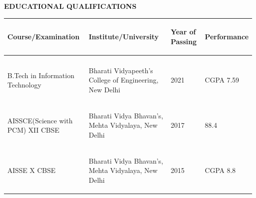 \documentclass[10pt]{article}
\begin{document}
\begin{minipage}{\textwidth}
\vspace{5mm}
\begin{huge}
\textbf{\color{theme}EDUCATIONAL QUALIFICATIONS}
\end{huge}
\begin{mdframed}[backgroundcolor=theme]
\end{mdframed}

\vspace{1mm}

\begin{tabular}{||m{4cm}|m{4cm}|m{2cm}|m{3cm}||}
\hline
\hline

\begin{center}
\textbf{Course/Examination}
\end{center} & \begin{center}
\textbf{Institute/University}
\end{center} & \begin{center}
\textbf{Year of Passing}
\end{center} & \begin{center}
\textbf{Performance}
\end{center}\\
\hline
&&&\\
\begin{center}
B.Tech in Information Technology
\end{center} & \begin{center}
Bharati Vidyapeeth's College of Engineering, New Delhi
\end{center} & \begin{center}
2021
\end{center} & \begin{center}
CGPA 7.59
\end{center}\\
\hline
\begin{center}
AISSCE(Science with PCM) XII CBSE
\end{center} & \begin{center}
Bharati Vidya Bhavan's, Mehta Vidyalaya, New Delhi
\end{center} & \begin{center}
2017
\end{center} & \begin{center}
88.4%
\end{center}\\
\hline
\begin{center}
AISSE X CBSE
\end{center} & \begin{center}
Bharati Vidya Bhavan's, Mehta Vidyalaya, New Delhi
\end{center} & \begin{center}
2015
\end{center} & \begin{center}
CGPA 8.8
\end{center}\\
\hline
\hline

\end{tabular}

\end{minipage}
\end{document}
